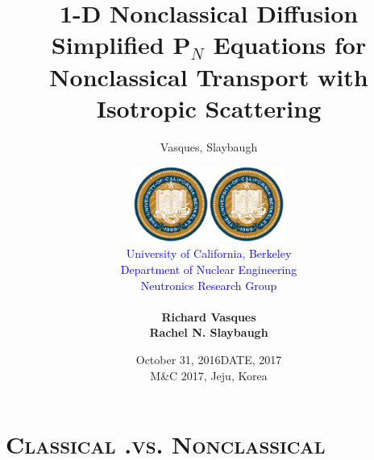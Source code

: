 \documentclass[xcolor=x11names, compress]{beamer}
\title{1-D Nonclassical Diffusion }
\author{Vasques, Slaybaugh}
\date{October 31, 2016}
\renewcommand{\(}{\begin{columns}}
\renewcommand{\)}{\end{columns}}
\newcommand{\<}[1]{\begin{column}{#1}}
\renewcommand{\>}{\end{column}}
\begin{document}

\begin{frame}[plain]
\title{Simplified P$_N$ Equations for Nonclassical Transport with Isotropic Scattering}
\author{
\begin{tabular}{ccc}
\multirow{6}{65pt}{\includegraphics[height=2.5cm]{images/title_bk.eps}}
& &
\multirow{6}{65pt}{\includegraphics[height=2.5cm]{images/title_bk.eps}} \\
&{\small\textcolor{blue}{University of California, Berkeley}} &\\
&{\small\textcolor{blue}{Department of Nuclear Engineering}}&\\
&{\small \textcolor{blue}{Neutronics Research Group}}&\\
& &\\
&\textbf{Richard Vasques}&\\
&\textbf{Rachel N. Slaybaugh}&\\
\end{tabular}}
\date{DATE, 2017 \\ M\&C 2017, Jeju, Korea}
\titlepage
\end{frame}


\section{\scshape Classical .vs. Nonclassical}
\end{document}
